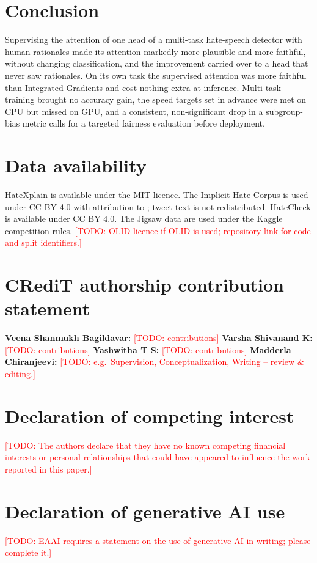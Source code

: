 \documentclass[preprint,12pt,authoryear]{elsarticle}
\newcommand{\todo}[1]{\textcolor{red}{[TODO: #1]}}
\begin{document}
\section{Conclusion}
\label{sec:conclusion}
Supervising the attention of one head of a multi-task hate-speech detector with human rationales made its attention markedly more plausible and more faithful, without changing classification, and the improvement carried over to a head that never saw rationales. On its own task the supervised attention was more faithful than Integrated Gradients and cost nothing extra at inference. Multi-task training brought no accuracy gain, the speed targets set in advance were met on CPU but missed on GPU, and a consistent, non-significant drop in a subgroup-bias metric calls for a targeted fairness evaluation before deployment.

\section*{Data availability}
HateXplain is available under the MIT licence. The Implicit Hate Corpus is used under CC BY 4.0 with attribution to \citet{elsherief2021latent}; tweet text is not redistributed. HateCheck is available under CC BY 4.0. The Jigsaw data are used under the Kaggle competition rules. \todo{OLID licence if OLID is used; repository link for code and split identifiers.}

\section*{CRediT authorship contribution statement}
\textbf{Veena Shanmukh Bagildavar:} \todo{contributions}
\textbf{Varsha Shivanand K:} \todo{contributions}
\textbf{Yashwitha T S:} \todo{contributions}
\textbf{Madderla Chiranjeevi:} \todo{e.g.\ Supervision, Conceptualization, Writing -- review \& editing.}

\section*{Declaration of competing interest}
\todo{The authors declare that they have no known competing financial interests or personal relationships that could have appeared to influence the work reported in this paper.}

\section*{Declaration of generative AI use}
\todo{EAAI requires a statement on the use of generative AI in writing; please complete it.}
\end{document}
